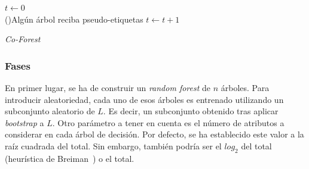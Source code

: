 \begin{itemize}
\begin{algorithm}
	\BlankLine

	$t \leftarrow 0$\\
	\While(){Algún árbol reciba pseudo-etiquetas}{
	$t \leftarrow t + 1$\\
	
}

	\caption{\textit{Co-Forest}}\label{alg:co-forest}
	\end{algorithm}

\subsubsection{Fases}

En primer lugar, se ha de construir un \textit{random forest} de $n$ árboles. Para introducir aleatoriedad, cada uno de esos árboles es entrenado utilizando un subconjunto aleatorio de $L$. Es decir, un subconjunto obtenido tras aplicar \textit{bootstrap} a $L$.
Otro parámetro a tener en cuenta es el número de atributos a considerar en cada árbol de decisión. Por defecto, se ha establecido este valor a la raíz cuadrada del total. Sin embargo, también podría ser el $log_{2}$ del total (heurística de Breiman~\cite{engelen2018thesis}) o el total.


\end{itemize}

